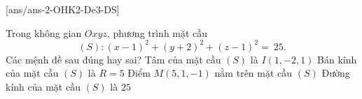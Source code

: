 \cauds
{}[ans/ans-2-OHK2-De3-DS]
\begin{ex}%
	Trong không gian $Oxyz$, phương trình mặt cầu $$(S) \colon (x-1)^{2} + (y+2)^{2} + (z-1)^{2} =~25.$$
	Các mệnh đề sau đúng hay sai?
	\choiceTF
	{\True Tâm của mặt cầu $(S)$ là $I(1,-2,1)$}
	{\True Bán kính của mặt cầu $(S)$ là $R = 5$}
	{Điểm $M(5,1,-1)$ nằm trên mặt cầu $(S)$}
	{Đường kính của mặt cầu $(S)$ là $25$}
\end{ex}
